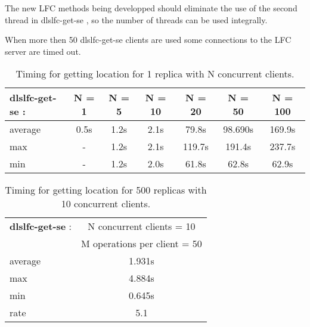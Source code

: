\documentclass[pdftex]{cmspaper}
\begin{document}
The new LFC methods being developped should eliminate the use of the 
second thread in dlslfc-get-se , so the number of threads can be 
used integrally.


When more then 50 dlslfc-get-se clients are used 
some connections to the LFC server are timed out.



\begin{table}[!htbp]
\begin{center}
 \begin{tabular}{|l|c|c|c|c|c|c|}         \hline
 {\bf dlslfc-get-se} : & N = 1  & N  = 5  & N = 10 & N = 20 & N = 50 & N = 100 \\ \hline
  average           & 0.5s   & 1.2s   & 2.1s  &  79.8s  & 98.690s  & 169.9s \\ \hline
  max               &  -     & 1.2s   & 2.1s  &  119.7s  & 191.4s  & 237.7s \\ \hline
  min               &  -     & 1.2s   & 2.0s  &  61.8s  & 62.8s   & 62.9s \\ \hline
\end{tabular}
\caption {Timing for getting location for 1 replica  with N concurrent clients.}\label{dlslfc-get-se-parallel}
\end{center}
\end{table}

\begin{table}[!htbp]
\begin{center}
 \begin{tabular}{|l|c|}         \hline
   {\bf dlslfc-get-se} : & N concurrent clients = 10 \\ 
    & M operations per client = 50\\ \hline
    average & 1.931s \\ \hline
    max & 4.884s \\ \hline
    min & 0.645s \\ \hline
    rate  & 5.1 \\ \hline
\end{tabular}
\caption {Timing for getting location for 500 replicas with 10 concurrent clients.}\label{dlslfc-get-se}
\end{center}
\end{table}
\end{document}
